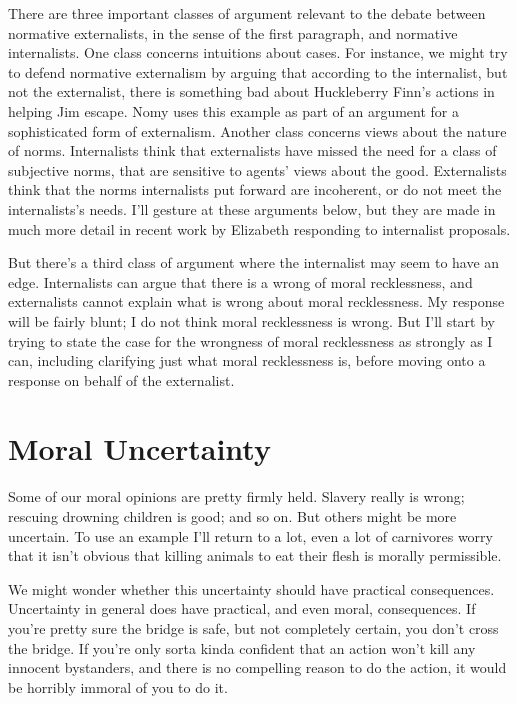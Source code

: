 There are three important classes of argument relevant to the debate between normative externalists, in the sense of the first paragraph, and normative internalists. One class concerns intuitions about cases. For instance, we might try to defend normative externalism by arguing that according to the internalist, but not the externalist, there is something bad about Huckleberry Finn's actions in helping Jim escape. Nomy  \citet{Arpaly2002} uses this example as part of an argument for a sophisticated form of externalism. Another class concerns views about the nature of norms. Internalists think that externalists have missed the need for a class of subjective norms, that are sensitive to agents' views about the good. Externalists think that the norms internalists put forward are incoherent, or do not meet the internalists's needs. I'll gesture at these arguments below, but they are made in much more detail in recent work by Elizabeth  \citet{Harman2013} responding to internalist proposals.

But there's a third class of argument where the internalist may seem to have an edge. Internalists can argue that there is a wrong of moral recklessness, and externalists cannot explain what is wrong about moral recklessness. My response will be fairly blunt; I do not think moral recklessness is wrong. But I'll start by trying to state the case for the wrongness of moral recklessness as strongly as I can, including clarifying just what moral recklessness is, before moving onto a response on behalf of the externalist.

\section{Moral Uncertainty}
\label{moraluncertainty}

Some of our moral opinions are pretty firmly held. Slavery really is wrong; rescuing drowning children is good; and so on. But others might be more uncertain. To use an example I'll return to a lot, even a lot of carnivores worry that it isn't obvious that killing animals to eat their flesh is morally permissible.

We might wonder whether this uncertainty should have practical consequences. Uncertainty in general does have practical, and even moral, consequences. If you're pretty sure the bridge is safe, but not completely certain, you don't cross the bridge. If you're only sorta kinda confident that an action won't kill any innocent bystanders, and there is no compelling reason to do the action, it would be horribly immoral of you to do it.

